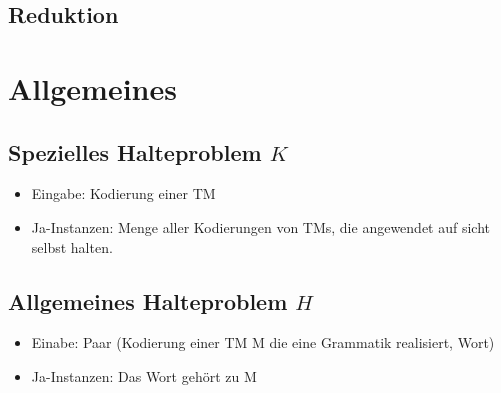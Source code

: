 \documentclass[ngerman]{scrartcl}
\begin{document}
\subsection{Reduktion}


\section{Allgemeines}
\subsection{Spezielles Halteproblem $ K $}
\begin{itemize}
    \item Eingabe: Kodierung einer TM
    \item Ja-Instanzen: Menge aller Kodierungen von TMs, die angewendet auf sicht selbst halten.
\end{itemize}

\subsection{Allgemeines Halteproblem $ H $}
\begin{itemize}
    \item Einabe: Paar (Kodierung einer TM M die eine Grammatik realisiert, Wort)
    \item Ja-Instanzen: Das Wort gehört zu M
\end{itemize}
\end{document}
